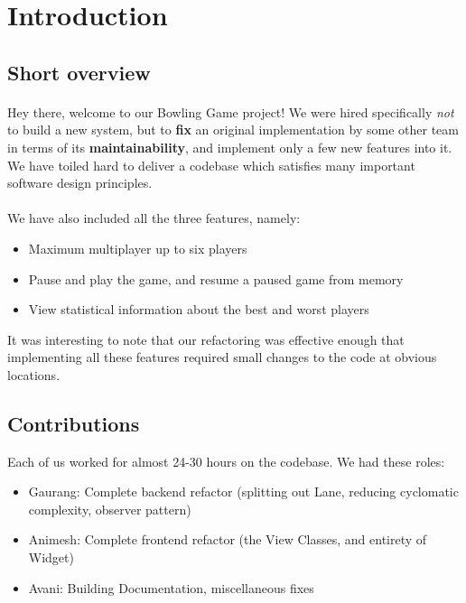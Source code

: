 \section{Introduction}

\subsection{Short overview}

\paragraph{} Hey there, welcome to our Bowling Game project! We were hired specifically \textit{not} to build a new system, but to \textbf{fix} an original implementation by some other team in terms of its \textbf{maintainability}, and implement only a few new features into it. We have toiled hard to deliver a codebase which satisfies many important software design principles.
\paragraph{} We have also included all the three features, namely:
\begin{itemize}
    \item Maximum multiplayer up to six players
    \item Pause and play the game, and resume a paused game from memory
    \item View statistical information about the best and worst players
\end{itemize}

It was interesting to note that our refactoring was effective enough that implementing all these features required small changes to the code at obvious locations.

\subsection{Contributions}

Each of us worked for almost 24-30 hours on the codebase. We had these roles:

\begin{itemize}
    \item Gaurang: Complete backend refactor (splitting out Lane, reducing cyclomatic complexity, observer pattern)
    \item Animesh: Complete frontend refactor (the View Classes, and entirety of Widget)
    \item Avani: Building Documentation, miscellaneous fixes
\end{itemize}